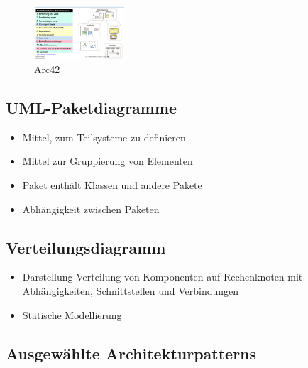 \documentclass[../ZF_SWEN1.tex]{subfiles}
\begin{document}
\begin{figure}[H]			\includegraphics[width=0.3\textwidth] {Resources/Images/Arc42.png}
\caption{\label{fig:Arc42}Arc42}
\end{figure}

\subsection{UML-Paketdiagramme}

\begin{itemize}
	\item Mittel, zum Teilsysteme zu definieren
	\item Mittel zur Gruppierung von Elementen
	\item Paket enthält Klassen und andere Pakete
	\item Abhängigkeit zwischen Paketen
\end{itemize}



\subsection{Verteilungsdiagramm} 

\begin{itemize}
	\item Darstellung Verteilung von Komponenten auf Rechenknoten mit Abhängigkeiten, Schnittstellen und Verbindungen
	\item Statische Modellierung
\end{itemize}




\subsection{Ausgewählte Architekturpatterns}
\end{document}
